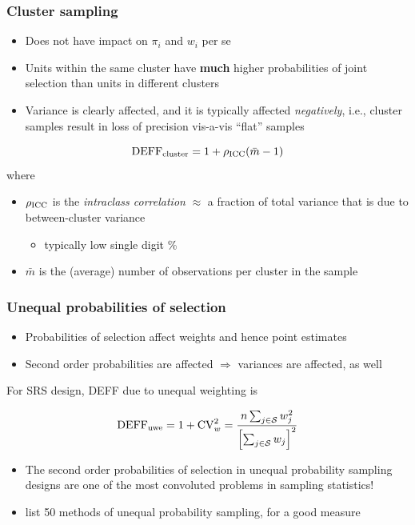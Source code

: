 \documentclass{beamer}
\begin{document}
\begin{frame}\frametitle{Cluster sampling}

\begin{itemize}
    \item Does not have impact on $\pi_i$ and $w_i$ per se
    \item Units within the same cluster have \textbf{much} higher probabilities of joint selection
        than units in different clusters
    \item Variance is clearly affected, and it is typically affected \textit{negatively},
        i.e., cluster samples result in loss of precision vis-a-vis ``flat'' samples
\end{itemize}

\bigskip

$$
{\rm DEFF}_{\rm cluster} = 1 + \rho_{\rm ICC}(\bar m-1)
$$
where
\begin{itemize}
    \item $\rho_{\rm ICC}$ is the \textit{intraclass correlation} $\approx$
        a fraction of total variance that is due to between-cluster variance
        \begin{itemize} \item typically low single digit \% \end{itemize}
    \item $\bar m$ is the (average) number of observations per cluster in the sample
\end{itemize}

\end{frame}

\begin{frame}\frametitle{Unequal probabilities of selection}

\begin{itemize}
    \item Probabilities of selection affect weights and hence point estimates
    \item Second order probabilities are affected $\Rightarrow$ variances are affected, as well
\end{itemize}

\medskip

For SRS design, DEFF due to unequal weighting is

$$
{\rm DEFF}_{\rm uwe} = 1 + {\rm CV}_w^2 = \frac{n \sum_{j\in\mathcal{S}} w_j^2}{\Bigl[\sum_{j\in\mathcal{S}} w_j\Bigr]^2}
$$

\medskip

\begin{itemize}
    \item The second order probabilities of selection in unequal probability sampling designs
        are one of the most convoluted problems in sampling statistics!
    \item \citet{brewer:hanif:1983} list 50 methods of unequal probability sampling, for a good measure
\end{itemize}


\end{frame}
\end{document}
